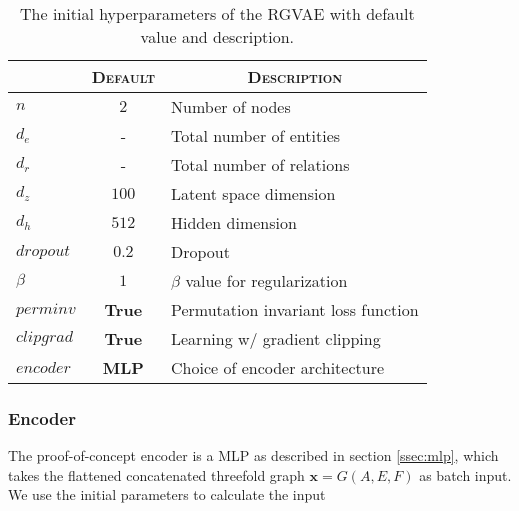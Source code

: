 \begin{table}[H]
\centering
    \begin{tabular}{|l|l|l|}
    \hline
    \rowcolor[HTML]{EFEFEF}
    \multicolumn{1}{|c}{\textsc{Hyerp.}} & \multicolumn{1}{c}{\textsc{Default}} & \multicolumn{1}{c|}{\textsc{Description}} \\\hline
    $n$     & \multicolumn{1}{c|}{$2$} & Number of nodes  \\
    $d_e$   &\multicolumn{1}{c|}{-}   & Total number of entities\\
    $d_r$   &\multicolumn{1}{c|}{-} & Total number of relations\\
    $d_z$ &\multicolumn{1}{c|}{$100$}   & Latent space dimension\\
    $d_h$ &\multicolumn{1}{c|}{$512$}   & Hidden dimension\\
    $dropout$ &\multicolumn{1}{c|}{$0.2$}   & Dropout\\
    $\beta$ & \multicolumn{1}{c|}{$1$}  & $\beta$ value for regularization  \\
    $perminv$ & \multicolumn{1}{c|}{\textbf{True}}  & Permutation invariant loss function  \\
    $clipgrad$ & \multicolumn{1}{c|}{\textbf{True}}  & Learning w/ gradient clipping  \\
    $encoder$ & \multicolumn{1}{c|}{\textbf{MLP}}  & Choice of encoder architecture  \\
    \hline
    \end{tabular}
    \caption{The initial hyperparameters of the RGVAE with default value and description.}
    \label{tab:RGVAEhyp}
\end{table}


\subsubsection{Encoder}

The proof-of-concept encoder is a MLP as described in section \ref{ssec:mlp}, which takes the flattened concatenated threefold graph $\mathbf{x}=G(A,E,F)$ as batch input. We use the initial parameters to calculate the input

